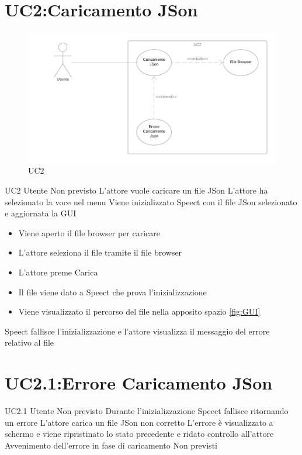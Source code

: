 \documentclass[../AnalisideiRequisiti.tex]{subfiles}
\begin{document}
	\section{UC2:Caricamento JSon}
	\begin{figure}[H]
		\caption{UC2}
		\centering
		\includegraphics[width=\textwidth]{../img/UC02.png}
	\end{figure}
	\UserCase
	{UC2}
	{Utente}
	{Non previsto}
	{L'attore vuole caricare un file JSon}
	{L'attore ha selezionato la voce nel menu }
	{Viene inizializzato Speect con il file JSon selezionato e aggiornata la GUI}
	{
		\begin{itemize}
			\item{} Viene aperto il file browser per caricare 
			\item{} L'attore seleziona il file tramite il file browser
			\item{} L'attore preme Carica
			\item{} Il file viene dato a Speect che prova l'inizializzazione
			\item{} Viene visualizzato il percorso del file nella apposito spazio \ref{fig:GUI}
		\end{itemize}
	}
	{Speect fallisce l'inizializzazione e l'attore visualizza il messaggio del errore relativo al file }
	\section{UC2.1:Errore Caricamento JSon}
	\UserCase
	{UC2.1}
	{Utente}
	{Non previsto}
	{Durante l'inizializzazione Speect fallisce ritornando un errore }
	{L'attore carica un file JSon non corretto}
	{L'errore è visualizzato a schermo e viene ripristinato lo stato precedente e ridato controllo all'attore}
	{Avvenimento dell'errore in fase di caricamento}
	{Non previsti}
\end{document}
